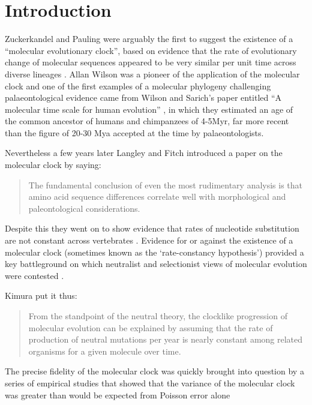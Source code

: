 \section{Introduction} 
Zuckerkandel and Pauling were arguably the first to suggest the existence of a ``molecular evolutionary clock'', based on evidence that the rate of evolutionary change of molecular sequences appeared to be very similar per unit time across diverse lineages \cite{zuckerkandl1965}. Allan Wilson was a pioneer of the application of the molecular clock and one of the first examples of a molecular phylogeny challenging palaeontological evidence came from Wilson and Sarich's paper entitled ``A molecular time scale for human evolution'' \cite{WilsonSarich1969}, in which they estimated an age of the common ancestor of humans and chimpanzees of 4-5Myr, far more recent than the figure of 20-30 Mya accepted at the time by palaeontologists.

Nevertheless a few years later Langley and Fitch \cite{LangleyFitch1974} introduced a paper on the molecular clock by saying:

\begin{quotation}
The fundamental conclusion of even the most rudimentary analysis is that amino acid sequence differences correlate well with morphological and paleontological considerations.
\end{quotation}

Despite this they went on to show evidence that rates of nucleotide substitution are not constant across vertebrates \cite{LangleyFitch1974}. Evidence for or against the existence of a molecular clock (sometimes known as the `rate-constancy hypothesis') provided a key battleground on which neutralist and selectionist views of molecular evolution were contested \cite{Kimura1987}.

Kimura \cite{Kimura1987} put it thus:

\begin{quotation}
From the standpoint of the neutral theory, the clocklike progression of molecular evolution can be explained by assuming that the rate of production of neutral mutations per year is nearly constant among related organisms for a given molecule over time. 
\end{quotation}
 
The precise fidelity of the molecular clock was quickly brought into question by a series of empirical studies that showed that the variance of the molecular clock was greater than would be expected from Poisson error alone \cite{}  

  
  
  
  
  
  
  
  
  
  
  
  
  
  
  
  
  
  
